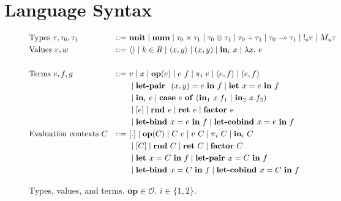 \section{Language Syntax}

\begin{figure}[tbp]
  \begin{alignat*}{3}
         &\text{Types } \tau, \tau_0, \tau_1 &::=~ &\mathbf{unit}
         \mid \textbf{num}
         \mid \tau_0 \times \tau_1
         \mid \tau_0 \otimes \tau_1
         \mid \tau_0 + \tau_1
         \mid \tau_0 \multimap \tau_1
         \mid {{!_{s}} \tau}
         \mid {M_u \tau}
         \\
         &\text{Values } v, w \ &::=~ &\langle \rangle
         \mid k \in R
         \mid \langle x,y \rangle 
         \mid (x, y)
         \mid \textbf{in}_i \ x
         \mid \lambda x.~e \\
         \\
         &\text{Terms } e, f, g &::=~ &v
         \mid x
         \mid \mathbf{op}(e)
         \mid e~f
         \mid {\pi}_i\ e
         \mid \langle e,f \rangle 
         \mid (e, f) \\
         & & & \mid \textbf{let-pair } \ (x,y) = e \ \textbf{in} \ f
         \mid \textbf{let } x  = e \ \textbf{in} \ f \\
         & & & \mid \textbf{in}_i \ e
         \mid 
          \mathbf{case} \ e \ \mathbf{of} \ (\textbf{in}_1 \ x.f_1 \ | \ \textbf{in}_2 \ x.f_2) \\
         & & &
         \mid [e]
         \mid \textbf{rnd } e
         \mid {\textbf{ret }e} 
         \mid \textbf{factor } e \\
         & & & 
         \mid {\textbf{let-bind }x = e \ \textbf{in}\ f}
         \mid \textbf{let-cobind } x = e \ \textbf{in} \ f
         \\
         &\text{Evaluation contexts } C &::=~ &[.] 
         \mid \mathbf{op}(C) 
         \mid C~e 
         \mid v~C 
         \mid \pi_i~C 
         \mid \mathbf{in}_i~C \\
         & & &
         \mid [ C ]
         \mid \mathbf{rnd}~C 
         \mid \mathbf{ret}~C 
         \mid \mathbf{factor}~C \\ 
         & & &
         \mid \textbf{let } x = C \ \textbf{in} \ f
         \mid \textbf{let-pair } x = C \ \textbf{in} \ f \\
         & & &
         \mid \textbf{let-bind } x = C \ \textbf{in} \ f
         \mid \textbf{let-cobind } x = C \ \textbf{in} \ f \\
  \end{alignat*}
  \caption{
    Types, values, and terms. $\mathbf{op} \in \mathcal{O}$. $i \in \{1, 2\}$. 
  }
  \label{fig:syntax}
\end{figure}
